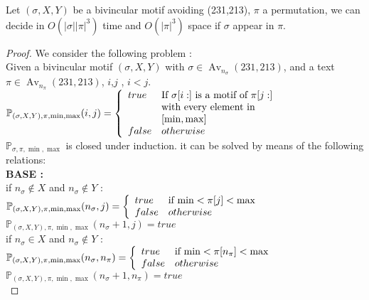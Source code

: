 \documentclass[a4paper]{llncs}
\DeclareMathOperator{\Avd}{Av}
\newcommand\Av[2]{\Avd_{{#1}}({#2})}
\newcommand{\ptext}{\pi}
\newcommand{\pmotif}{\sigma}
\newcommand{\x}{X}
\newcommand{\y}{Y}
\newcommand{\bmotif}{(\sigma,\x,\y)}
\begin{document}
			\begin{proposition}
			Let $\bmotif$ be a bivincular motif 
			avoiding (231,213), 
			$\ptext$ a permutation,
			we can decide in $O(|\pmotif||\ptext|^3)$ time
			and $O(|\ptext|^3)$ space
			if $\pmotif$ 
			appear in $\ptext$.
			\end{proposition}
					
			\begin{proof}
			We consider the following problem :\\
			
			Given a bivincular motif $\bmotif$ with $\pmotif \in \Av{n_\pmotif}{231,213} $, and a text $\ptext \in \Av{n_\ptext}{231,213}$, $i$,$j$ , $i<j$.\\
			
			$\mathbb{P}_{\bmotif,\ptext,\min,\max}(i,j)= \left\{ 
				\begin{array}{l l}
					true & \text{If $\pmotif[i:]$ is a motif of $\ptext[j:]$}\\
						& \text{with every element in}\\ 
						&[\min,\max]\\
		
					false & otherwise\\
				\end{array} \right.$\\
		
		
		
		
			$\mathbb{P}_{\pmotif,\ptext,\min,\max}$ is closed under induction. 
			it can be
			solved by means of the following relations:\\
			
			
			\textbf{BASE :} \\
			
			if $n_\pmotif \notin  \x $
			and $n_\pmotif \notin  \y$ : \\		
			$\mathbb{P}_{\bmotif,\ptext,\min,\max}(n_\pmotif,j)= \left\{ 
					\begin{array}{l l}
						true & \text{if $\min<\ptext[j]<\max$
						}\\
						false & otherwise\\
					\end{array} \right. $\\	
			$\mathbb{P}_{\bmotif,\ptext,\min,\max}(n_\pmotif+1,j)= true $\\
			
			if $n_\pmotif \in  \x $
			and $n_\pmotif \notin  \y$ : \\		
			$\mathbb{P}_{\bmotif,\ptext,\min,\max}(n_\pmotif,n_\ptext)= \left\{ 
					\begin{array}{l l}
						true & \text{if $\min<\ptext[n_\ptext]<\max$
						}\\
						false & otherwise\\
					\end{array} \right. $\\	
			$\mathbb{P}_{\bmotif,\ptext,\min,\max}(n_\pmotif+1,n_\ptext)= true $\\
			

\end{proof}
\end{document}
